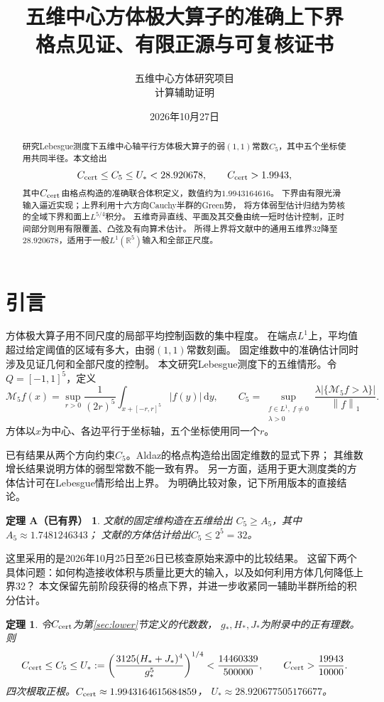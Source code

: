 \documentclass[UTF8,fontset=fandol,zihao=-4,a4paper]{ctexart}
\title{五维中心方体极大算子的准确上下界\\
\large 格点见证、有限正源与可复核证书}
\author{五维中心方体研究项目\\\small 计算辅助证明}
\date{2026年10月27日}
\newtheorem{theorem}{定理}[section]
\newcommand{\R}{\mathbb R}
\newcommand{\1}{\mathbf 1}
\newcommand{\dd}{\,\mathrm d}
\newcommand{\norm}[1]{\left\lVert#1\right\rVert}
\begin{document}
\maketitle
\begin{abstract}
研究Lebesgue测度下五维中心轴平行方体极大算子的弱$(1,1)$常数$C_5$，其中五个坐标使用共同半径。本文给出
\[
 C_{\rm cert}\le C_5\le U_*<28.920678,\qquad C_{\rm cert}>1.9943,
\]
其中$C_{\rm cert}$由格点构造的准确联合体积定义，数值约为$1.9943164616$。
下界由有限光滑输入逼近实现；上界利用十六方向Cauchy半群的Green势，
将方体弱型估计归结为势核的全域下界和面上$L^{5/4}$积分。
五维奇异直线、平面及其交叠由统一短时估计控制，正时间部分则用有限覆盖、凸弦及有向算术估计。
所得上界将文献中的通用五维界$32$降至$28.920678$，适用于一般$L^1(\R^5)$输入和全部正尺度。
\end{abstract}

\section{引言}
方体极大算子用不同尺度的局部平均控制函数的集中程度。
在端点$L^1$上，平均值超过给定阈值的区域有多大，由弱$(1,1)$常数刻画。
固定维数中的准确估计同时涉及见证几何和全部尺度的控制。
本文研究Lebesgue测度下的五维情形。令$Q=[-1,1]^5$，定义
\[
 \mathcal M_5f(x)=\sup_{r>0}\frac1{(2r)^5}
      \int_{x+[-r,r]^5}|f(y)|\dd y,\qquad
 C_5=\sup_{\substack{f\in L^1,\ f\ne0\\\lambda>0}}
 \frac{\lambda|\{\mathcal M_5f>\lambda\}|}{\norm f_1}.
\]
方体以$x$为中心、各边平行于坐标轴，五个坐标使用同一个$r$。

已有结果从两个方向约束$C_5$。Aldaz的格点构造给出固定维数的显式下界；
其维数增长结果说明方体的弱型常数不能一致有界\cite{Aldaz2000,Aldaz2011}。
另一方面，适用于更大测度类的方体估计可在Lebesgue情形给出上界\cite{Aldaz2020}。
为明确比较对象，记下所用版本的直接结论。
\newtheorem*{known}{定理 A（已有界）}
\begin{known}
文献\cite[命题1.4]{Aldaz2000}的固定维构造在五维给出
$C_5\ge A_5$，其中$A_5\approx1.7481246343$；
文献\cite[推论3.4]{Aldaz2020}的方体估计给出$C_5\le2^5=32$。
\end{known}
这里采用的是2026年10月25日至26日已核查原始来源中的比较结果。
这留下两个具体问题：如何构造接收体积与质量比更大的输入，以及如何利用方体几何降低上界$32$？
本文保留先前阶段获得的格点下界，并进一步收紧同一辅助半群所给的积分估计。

\begin{theorem}\label{thm:main}
令$C_{\rm cert}$为第\ref{sec:lower}节定义的代数数，
$g_*,H_*,J_*$为附录中的正有理数。则
\[
 C_{\rm cert}\le C_5\le U_*
 :=\left(\frac{3125(H_*+J_*)^4}{g_*^5}\right)^{1/4}
 <\frac{14460339}{500000},\qquad
 C_{\rm cert}>\frac{19943}{10000}.
\]
四次根取正根。$C_{\rm cert}\approx1.9943164615684859$，
$U_*\approx28.920677505176677$。
\end{theorem}
\end{document}

